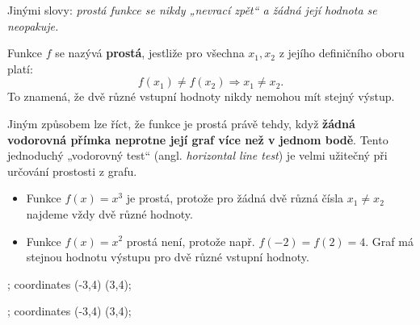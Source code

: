 \documentclass[12pt,a4paper]{article}
\begin{document}
Jinými slovy: \textit{prostá funkce se nikdy „nevrací zpět“ a žádná její hodnota se neopakuje.}

\begin{definitionbox}

Funkce \(f\) se nazývá \textbf{prostá}, jestliže pro všechna \(x_1, x_2\) z jejího definičního oboru platí:
\[
f(x_1) \neq f(x_2) \Rightarrow x_1 \neq x_2.
\]
To znamená, že dvě různé vstupní hodnoty nikdy nemohou mít stejný výstup.
\end{definitionbox}
\newpage
Jiným způsobem lze říct, že funkce je prostá právě tehdy, když \textbf{žádná vodorovná přímka neprotne její graf více než v jednom bodě}.  
Tento jednoduchý „vodorovný test“ (angl. \textit{horizontal line test}) je velmi užitečný při určování prostosti z grafu.

\begin{examplebox}
\begin{itemize}
    \item Funkce \(f(x) = x^3\) je prostá, protože pro žádná dvě různá čísla
     \(x_1 \neq x_2\) najdeme vždy dvě různé hodnoty.
    \item Funkce \(f(x) = x^2\) prostá není, protože např. \(f(-2) = f(2) = 4\).  
    Graf má stejnou hodnotu výstupu pro dvě různé vstupní hodnoty.
\end{itemize}

\begin{center}
    \begin{minipage}{0.45\textwidth}
    \centering
        \begin{axisgraph}[
            grid=none,
            xmin=-3, xmax=3,
            ymin=-5, ymax=5,
            title={Prostá funkce $f(x)=x^3$}
        ]
            ;
             coordinates {(-3,4) (3,4)};
        \end{axisgraph}
    \end{minipage}
    \hfill
    \begin{minipage}{0.45\textwidth}
    \centering
        \begin{axisgraph}[
            grid=none,
            xmin=-3, xmax=3,
            ymin=-1, ymax=9,
            title={Neprostá funkce $f(x)=x^2$}
        ]
            ;
             coordinates {(-3,4) (3,4)};
        \end{axisgraph}
    \end{minipage}
\end{center}

\end{examplebox}
\end{document}
